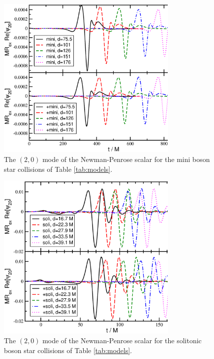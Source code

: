 \documentclass[]{iopart}
\begin{document}
%
%
\begin{figure}
    \centering
    \includegraphics[width=250pt]{mini_psi20.eps}
    \caption{The $(2,0)$ mode of the Newman-Penrose scalar
    for the mini boson star collisions of Table \ref{tab:models}.
    }
    \label{fig:mini_psi20}
\end{figure}
%
%
\begin{figure}
    \centering
    \includegraphics[width=250pt]{soli_psi20.eps}
    \caption{The $(2,0)$ mode of the Newman-Penrose scalar
    for the solitonic boson star collisions of Table \ref{tab:models}.
    }
    \label{fig:soli_psi20}
\end{figure}
%
\end{document}
